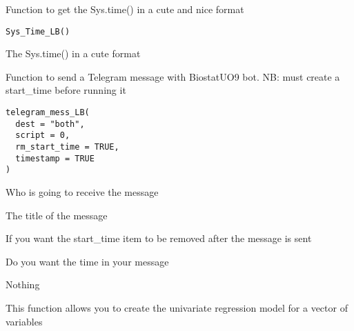 \documentclass[a4paper]{book}
\begin{document}
%
\begin{Description}
Function to get the Sys.time() in a cute and nice format
\end{Description}
%
\begin{Usage}
\begin{verbatim}
Sys_Time_LB()
\end{verbatim}
\end{Usage}
%
\begin{Value}
The Sys.time() in a cute format
\end{Value}
%
\begin{Description}
Function to send a Telegram message with BiostatUO9 bot. NB: must create a start\_time before running it
\end{Description}
%
\begin{Usage}
\begin{verbatim}
telegram_mess_LB(
  dest = "both",
  script = 0,
  rm_start_time = TRUE,
  timestamp = TRUE
)
\end{verbatim}
\end{Usage}
%
\begin{Arguments}
\begin{ldescription}
\item[\code{dest}] Who is going to receive the message

\item[\code{script}] The title of the message

\item[\code{rm\_start\_time}] If you want the start\_time item to be removed after the message is sent

\item[\code{timestamp}] Do you want the time in your message
\end{ldescription}
\end{Arguments}
%
\begin{Value}
Nothing
\end{Value}
%
\begin{Description}
This function allows you to create the univariate regression model for a vector of variables
\end{Description}
\end{document}
